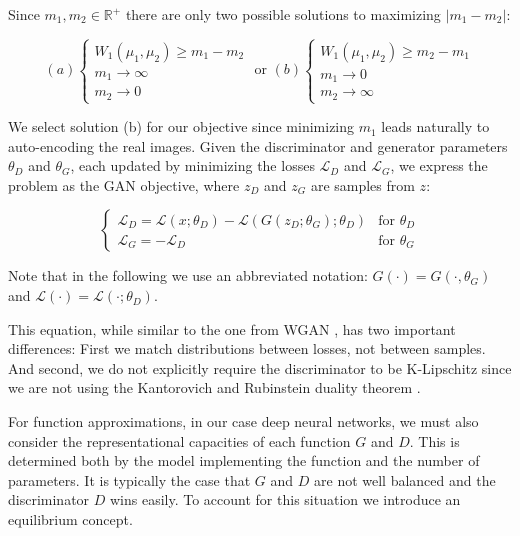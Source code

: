 \documentclass[english]{article}
\begin{document}
Since $m_{1},m_{2}\in\mathbb{R}^{+}$ there are only two possible
solutions to maximizing $|m_{1}-m_{2}|$:

\[
(a)\begin{cases}
W_{1}(\mu_{1},\mu_{2})\geqslant m_{1}-m_{2}\\
m_{1}\rightarrow\infty\\
m_{2}\rightarrow0
\end{cases}\textrm{ or }(b)\begin{cases}
W_{1}(\mu_{1},\mu_{2})\geqslant m_{2}-m_{1}\\
m_{1}\rightarrow0\\
m_{2}\rightarrow\infty
\end{cases}
\]


We select solution (b) for our objective since minimizing $m_{1}$
leads naturally to auto-encoding the real images. Given the discriminator
and generator parameters $\theta_{D}$ and $\theta_{G}$, each updated
by minimizing the losses $\mathcal{L}_{D}$ and $\mathcal{L}_{G}$,
we express the problem as the GAN objective, where $z_{D}$ and $z_{G}$
are samples from $z$:

\begin{equation}
\begin{cases}
\mathcal{L}_{D}=\mathcal{L}(x;\theta_{D})-\mathcal{L}(G(z_{D};\theta_{G});\theta_{D}) & \textrm{for }\theta_{D}\\
\mathcal{L}_{G}=-\mathcal{L}_{D} & \textrm{for }\theta_{G}
\end{cases}\label{eq:wbgan}
\end{equation}


Note that in the following we use an abbreviated notation: $G(\cdot)=G(\cdot,\theta_{G})$
and $\mathcal{L}(\cdot)=\mathcal{L}(\cdot;\theta_{D})$.

This equation, while similar to the one from WGAN \cite{arjovsky2017wasserstein},
has two important differences: First we match distributions between
losses, not between samples. And second, we do not explicitly require
the discriminator to be K-Lipschitz since we are not using the Kantorovich
and Rubinstein duality theorem \cite{villani2008optimal}.

For function approximations, in our case deep neural networks, we
must also consider the representational capacities of each function
$G$ and $D$. This is determined both by the model implementing the
function and the number of parameters. It is typically the case that
$G$ and $D$ are not well balanced and the discriminator $D$ wins
easily. To account for this situation we introduce an equilibrium
concept.
\end{document}
